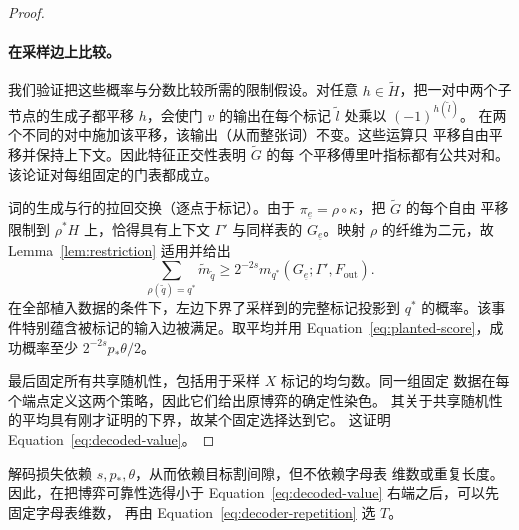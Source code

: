 \begin{proof}
\paragraph{在采样边上比较。}
我们验证把这些概率与分数比较所需的限制假设。对任意
$h\in\widetilde H$，把一对中两个子节点的生成子都平移 $h$，会使门
$v$ 的输出在每个标记 $\widetilde l$ 处乘以 $(-1)^{h(\widetilde l)}$。
在两个不同的对中施加该平移，该输出（从而整张词）不变。这些运算只
平移自由平移并保持上下文。因此特征正交性表明 $\widetilde G$ 的每
个平移傅里叶指标都有公共对和。该论证对每组固定的门表都成立。

词的生成与行的拉回交换（逐点于标记）。由于
$\pi_{\underline e}=\rho\circ\kappa$，把 $\widetilde G$ 的每个自由
平移限制到 $\rho^*H$ 上，恰得具有上下文 $\Gamma'$ 与同样表的
$G_{\underline e}$。映射 $\rho$ 的纤维为二元，故
Lemma~\ref{lem:restriction} 适用并给出
\[
 \sum_{\rho(\widetilde q)=q^*}\widetilde m_{\widetilde q}
 \geq 2^{-2s}
 m_{q^*}(G_{\underline e};\Gamma',F_{\mathrm{out}}).
\]
在全部植入数据的条件下，左边下界了采样到的完整标记投影到 $q^*$
的概率。该事件特别蕴含被标记的输入边被满足。取平均并用
Equation~\eqref{eq:planted-score}，成功概率至少
$2^{-2s}p_*\theta/2$。

最后固定所有共享随机性，包括用于采样 $X$ 标记的均匀数。同一组固定
数据在每个端点定义这两个策略，因此它们给出原博弈的确定性染色。
其关于共享随机性的平均具有刚才证明的下界，故某个固定选择达到它。
这证明 Equation~\eqref{eq:decoded-value}。
\end{proof}

解码损失依赖 $s,p_*,\theta$，从而依赖目标割间隙，但不依赖字母表
维数或重复长度。因此，在把博弈可靠性选得小于
Equation~\eqref{eq:decoded-value} 右端之后，可以先固定字母表维数，
再由 Equation~\eqref{eq:decoder-repetition} 选 $T$。

